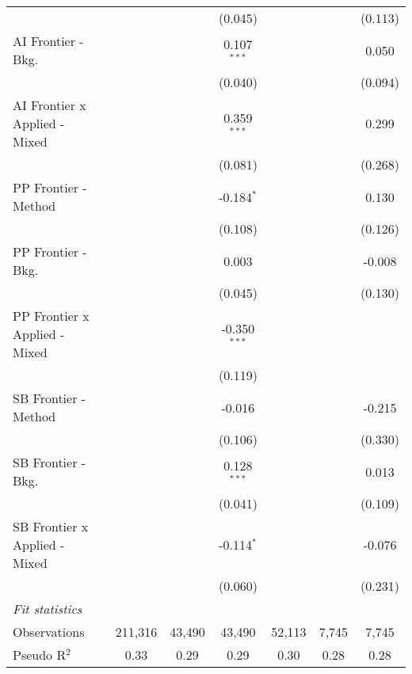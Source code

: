 \begin{tabular}{lcccccc}
                                 &               &               & (0.045)        &               &               & (0.113)\\   
   AI Frontier - Bkg.            &               &               & 0.107$^{***}$  &               &               & 0.050\\   
                                 &               &               & (0.040)        &               &               & (0.094)\\   
   AI Frontier x Applied - Mixed &               &               & 0.359$^{***}$  &               &               & 0.299\\   
                                 &               &               & (0.081)        &               &               & (0.268)\\   
   PP Frontier - Method          &               &               & -0.184$^{*}$   &               &               & 0.130\\   
                                 &               &               & (0.108)        &               &               & (0.126)\\   
   PP Frontier - Bkg.            &               &               & 0.003          &               &               & -0.008\\   
                                 &               &               & (0.045)        &               &               & (0.130)\\   
   PP Frontier x Applied - Mixed &               &               & -0.350$^{***}$ &               &               &   \\   
                                 &               &               & (0.119)        &               &               &   \\   
   SB Frontier - Method          &               &               & -0.016         &               &               & -0.215\\   
                                 &               &               & (0.106)        &               &               & (0.330)\\   
   SB Frontier - Bkg.            &               &               & 0.128$^{***}$  &               &               & 0.013\\   
                                 &               &               & (0.041)        &               &               & (0.109)\\   
   SB Frontier x Applied - Mixed &               &               & -0.114$^{*}$   &               &               & -0.076\\   
                                 &               &               & (0.060)        &               &               & (0.231)\\   
   \midrule
   \emph{Fit statistics}\\
   Observations                  & 211,316       & 43,490        & 43,490         & 52,113        & 7,745         & 7,745\\  
   Pseudo R$^2$                  & 0.33          & 0.29          & 0.29           & 0.30          & 0.28          & 0.28\\  
   

\end{tabular}
